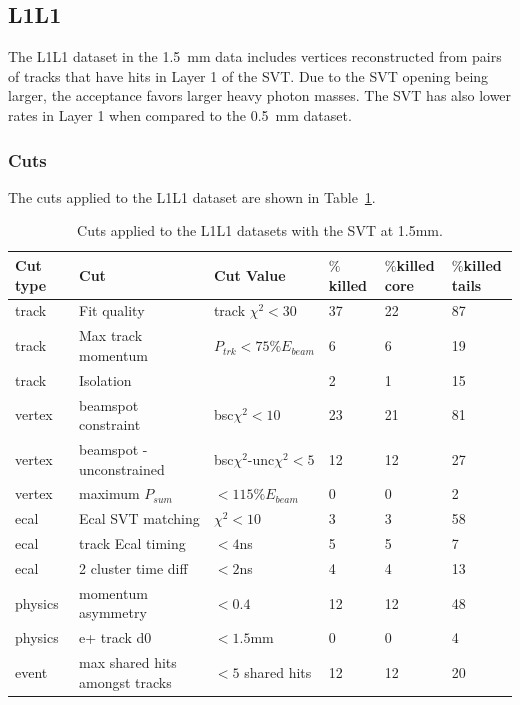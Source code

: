 \subsection{L1L1}

The L1L1 dataset in the 1.5~mm data includes vertices reconstructed from pairs of tracks that have hits in Layer 1 of the SVT. Due to the SVT opening being larger, the acceptance favors larger heavy photon masses. The SVT has also lower rates in Layer 1 when compared to the 0.5~mm dataset.


\subsubsection{Cuts}

The cuts applied to the L1L1 dataset are shown in Table~\ref{l1l1_cuts_1p5}.

\begin{table}[H]
\caption{Cuts applied to the L1L1 datasets with the SVT at 1.5mm.}
\label{l1l1_cuts_1p5}
\centering
\begin{tabular}{llllll}
\toprule
Cut type & Cut & Cut Value &  $\%$killed &  $\%$killed core & $\%$killed tails\\
\midrule
track & Fit quality & track $\chi^{2}<30$ & 37 & 22 & 87 \\
track & Max track momentum &  $P_{trk}<75\%E_{beam}$ & 6 & 6 & 19 \\
track & Isolation &   & 2 & 1 & 15 \\
vertex & beamspot constraint & bsc$\chi^{2}<10$  & 23 & 21 & 81 \\
vertex & beamspot - unconstrained & bsc$\chi^{2}$-unc$\chi^2<5$  & 12 & 12 & 27 \\
vertex & maximum $P_{sum}$ &  $<115\%E_{beam}$ & 0 & 0 & 2 \\
ecal & Ecal SVT matching & $\chi^2<10$  & 3 & 3 & 58 \\
ecal & track Ecal timing & $<4$ns  & 5 & 5 & 7 \\
ecal & 2 cluster time diff & $<2$ns  & 4 & 4 & 13 \\
physics & momentum asymmetry & $<0.4$  & 12 & 12 & 48 \\
physics & e+ track d0 & $<1.5$mm  & 0 & 0 & 4 \\
event & max shared hits amongst tracks & $<5$ shared hits  & 12 & 12 & 20 \\
\bottomrule
\end{tabular}
\end{table}

